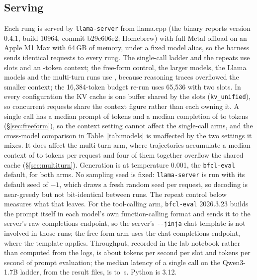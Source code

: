 \documentclass[12pt,letterpaper]{article}
\newcommand{\qm}{Qwen3-1.7B}
\begin{document}
\subsection{Serving}
\label{sec:serving}
Each rung is served by \texttt{llama-server} from llama.cpp (the binary reports version 0.4.1, build 10964, commit b29c606e2; Homebrew) with full Metal offload on an Apple M1 Max with 64\,GB of memory, under a fixed model alias, so the harness sends identical requests to every rung. The single-call ladder and the repeats use \qtLadderSlots{} slots and an \qtLadderCtx{}-token context; the free-form control, the larger models, the Llama models and the multi-turn runs use \qtMtCtxSlot{}, because reasoning traces overflowed the smaller context; the 16{,}384-token budget re-run uses 65{,}536 with two slots. In every configuration the KV cache is one buffer shared by the slots (\texttt{kv\_unified}), so concurrent requests share the context figure rather than each owning it. A single call has a median prompt of \qtToolInMedEight{} tokens and a median completion of \qtToolNgenMedThree{} to \qtToolNgenMedEight{} tokens (\S\ref{sec:freeform}), so the context setting cannot affect the single-call arms, and the cross-model comparison in Table~\ref{tab:models} is unaffected by the two settings it mixes. It does affect the multi-turn arm, where trajectories accumulate a median context of \qtMtCtxMedEight{} to \qtMtCtxMedThree{} tokens per request and four of them together overflow the shared cache (\S\ref{sec:multiturn}). Generation is at temperature 0.001, the \texttt{bfcl-eval} default, for both arms. No sampling seed is fixed: \texttt{llama-server} is run with its default seed of $-1$, which draws a fresh random seed per request, so decoding is near-greedy but not bit-identical between runs. The repeat control below measures what that leaves. For the tool-calling arm, \texttt{bfcl-eval} 2026.3.23 builds the prompt itself in each model's own function-calling format and sends it to the server's raw completions endpoint, so the server's \texttt{-{}-jinja} chat template is not involved in those runs; the free-form arm uses the chat completions endpoint, where the template applies. Throughput, recorded in the lab notebook rather than computed from the logs, is about \qtMacTg{} tokens per second per slot and \qtMacPp{} tokens per second of prompt evaluation; the median latency of a single call on the \qm{} ladder, from the result files, is \qtToolLatMedEight{} to \qtToolLatMedFour{}\,s. Python is 3.12.
\end{document}
